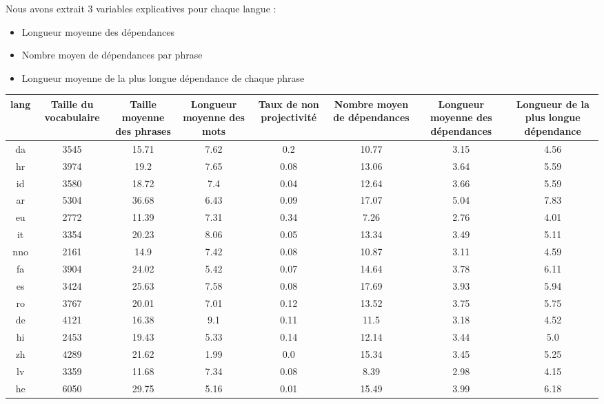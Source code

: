 \documentclass[a4paper, twoside, 12pt]{article}
\begin{document}
    Nous avons extrait 3 variables explicatives pour chaque langue :
    \begin{itemize}
        \item Longueur moyenne des dépendances
        \item Nombre moyen de dépendances par phrase
        \item Longueur moyenne de la plus longue dépendance de chaque phrase
    \end{itemize}

\begin{table}[!h]
    \centering
    \begin{tabulary}{\textwidth}{CCCCCCCC}
        \toprule
        \textbf{lang} & \textbf{Taille du vocabulaire} & \textbf{Taille moyenne des phrases} & \textbf{Longueur moyenne des mots} & \textbf{Taux de non  projectivité} & \textbf{Nombre moyen de dépendances} & \textbf{Longueur moyenne des dépendances} & \textbf{Longueur de la plus longue dépendance} \\
        \midrule
        da & 3545 & 15.71 & 7.62 & 0.2 & 10.77 & 3.15 & 4.56 \\
        hr & 3974 & 19.2 & 7.65 & 0.08 & 13.06 & 3.64 & 5.59 \\
        id & 3580 & 18.72 & 7.4 & 0.04 & 12.64 & 3.66 & 5.59 \\
        ar & 5304 & 36.68 & 6.43 & 0.09 & 17.07 & 5.04 & 7.83 \\
        eu & 2772 & 11.39 & 7.31 & 0.34 & 7.26 & 2.76 & 4.01 \\
        it & 3354 & 20.23 & 8.06 & 0.05 & 13.34 & 3.49 & 5.11 \\
        nno & 2161 & 14.9 & 7.42 & 0.08 & 10.87 & 3.11 & 4.59 \\
        fa & 3904 & 24.02 & 5.42 & 0.07 & 14.64 & 3.78 & 6.11 \\
        es & 3424 & 25.63 & 7.58 & 0.08 & 17.69 & 3.93 & 5.94 \\
        ro & 3767 & 20.01 & 7.01 & 0.12 & 13.52 & 3.75 & 5.75 \\
        de & 4121 & 16.38 & 9.1 & 0.11 & 11.5 & 3.18 & 4.52 \\
        hi & 2453 & 19.43 & 5.33 & 0.14 & 12.14 & 3.44 & 5.0 \\
        zh & 4289 & 21.62 & 1.99 & 0.0 & 15.34 & 3.45 & 5.25 \\
        lv & 3359 & 11.68 & 7.34 & 0.08 & 8.39 & 2.98 & 4.15 \\
        he & 6050 & 29.75 & 5.16 & 0.01 & 15.49 & 3.99 & 6.18 \\

\end{tabulary}
\end{table}
\end{document}
